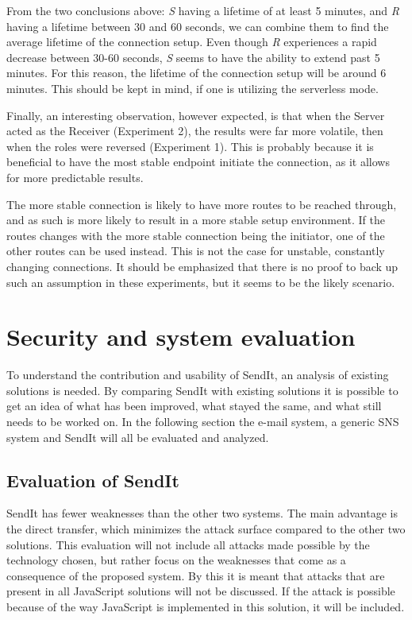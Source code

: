 From the two conclusions above: \textit{S} having a lifetime of at least 5 minutes, and \textit{R} having a lifetime between 30 and 60 seconds, we can combine them to find the average lifetime of the connection setup. Even though \textit{R} experiences a rapid decrease between 30-60 seconds, \textit{S} seems to have the ability to extend past 5 minutes. For this reason, the lifetime of the connection setup will be around 6 minutes. This should be kept in mind, if one is utilizing the serverless mode.

Finally, an interesting observation, however expected, is that when the Server acted as the Receiver (Experiment 2), the results were far more volatile, then when the roles were reversed (Experiment 1). This is probably because it is beneficial to have the most stable endpoint initiate the connection, as it allows for more predictable results.

The more stable connection is likely to have more routes to be reached through, and as such is more likely to result in a more stable setup environment. If the routes changes with the more stable connection being the initiator, one of the other routes can be used instead. This is not the case for unstable, constantly changing connections. It should be emphasized that there is no proof to back up such an assumption in these experiments, but it seems to be the likely scenario.
%
%
\section{Security and system evaluation}
To understand the contribution and usability of SendIt, an analysis of existing solutions is needed. By comparing SendIt with existing solutions it is possible to get an idea of what has been improved, what stayed the same, and what still needs to be worked on. In the following section the e-mail system, a generic SNS system and SendIt will all be evaluated and analyzed.
%
\subsection{Evaluation of SendIt}
%
  SendIt has fewer weaknesses than the other two systems. The main advantage is the direct transfer, which minimizes the attack surface compared to the other two solutions. This evaluation will not include all attacks made possible by the technology chosen, but rather focus on the weaknesses that come as a consequence of the proposed system. By this it is meant that attacks that are present in all JavaScript solutions will not be discussed. If the attack is possible because of the way JavaScript is implemented in this solution, it will be included.
%
